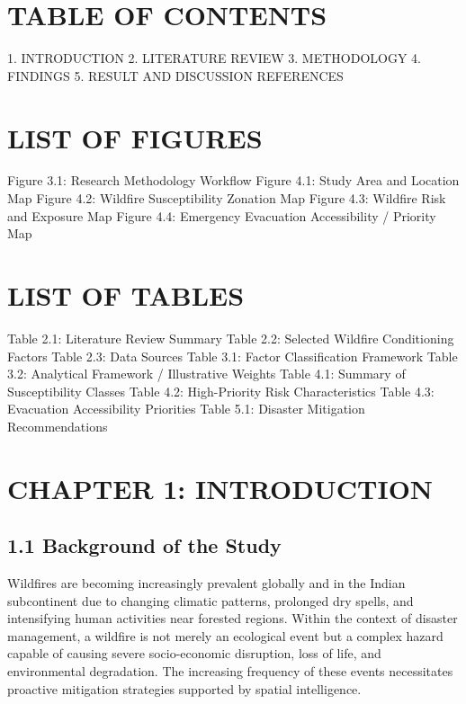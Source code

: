 \documentclass[12pt,a4paper]{article}
\begin{document}
\clearpage
\section*{TABLE OF CONTENTS}

1. INTRODUCTION
2. LITERATURE REVIEW
3. METHODOLOGY
4. FINDINGS
5. RESULT AND DISCUSSION
REFERENCES



\clearpage
\section*{LIST OF FIGURES}

Figure 3.1: Research Methodology Workflow
Figure 4.1: Study Area and Location Map
Figure 4.2: Wildfire Susceptibility Zonation Map
Figure 4.3: Wildfire Risk and Exposure Map
Figure 4.4: Emergency Evacuation Accessibility / Priority Map



\clearpage
\section*{LIST OF TABLES}

Table 2.1: Literature Review Summary
Table 2.2: Selected Wildfire Conditioning Factors
Table 2.3: Data Sources
Table 3.1: Factor Classification Framework
Table 3.2: Analytical Framework / Illustrative Weights
Table 4.1: Summary of Susceptibility Classes
Table 4.2: High-Priority Risk Characteristics
Table 4.3: Evacuation Accessibility Priorities
Table 5.1: Disaster Mitigation Recommendations



\clearpage
\section*{CHAPTER 1: INTRODUCTION}


\subsection*{1.1 Background of the Study}

Wildfires are becoming increasingly prevalent globally and in the Indian subcontinent due to changing climatic patterns, prolonged dry spells, and intensifying human activities near forested regions. Within the context of disaster management, a wildfire is not merely an ecological event but a complex hazard capable of causing severe socio-economic disruption, loss of life, and environmental degradation. The increasing frequency of these events necessitates proactive mitigation strategies supported by spatial intelligence.
\end{document}
